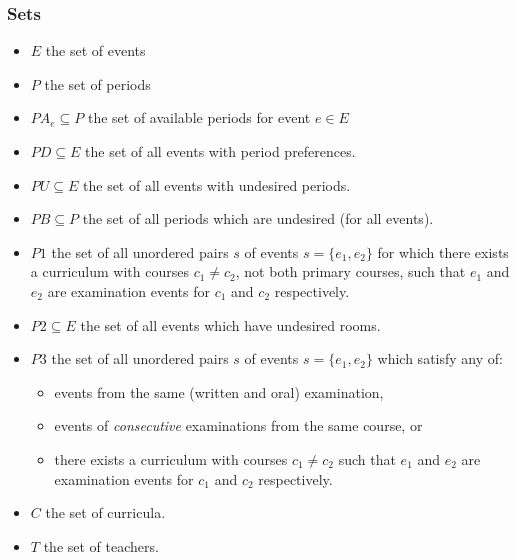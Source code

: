 \documentclass{article}
\theoremstyle{plain}
\numberwithin{theorem}{section}
\numberwithin{example}{section}
\theoremstyle{definition}
\begin{document}
\subsubsection*{Sets}
\begin{itemize}
    \item $E$ the set of events
    \item $P$ the set of periods
    \item $PA_e \subseteq P$ the set of available periods for event $e \in E$
    \item $PD \subseteq E$ the set of all events with period preferences.
    \item $PU \subseteq E$ the set of all events with undesired periods.
    \item $PB \subseteq P$ the set of all periods which are undesired (for all
        events).
    \item $P1$ the set of all unordered pairs $s$ of events $s = \{e_1, e_2\}$
        for which there exists a curriculum with courses $c_1 \neq c_2$, not
        both primary courses, such that $e_1$ and $e_2$ are examination events
        for $c_1$ and $c_2$ respectively.
    \item $P2 \subseteq E$ the set of all events which have undesired rooms.
    \item $P3$ the set of all unordered pairs $s$ of events $s = \{e_1, e_2\}$
        which satisfy any of:
        \begin{itemize}
            \item events from the same (written and oral) examination,
            \item events of \emph{consecutive} examinations from the same
                course, or
            \item there exists a curriculum with courses $c_1 \neq c_2$ such
            that $e_1$ and $e_2$ are examination events for $c_1$ and $c_2$
            respectively.
        \end{itemize}
    \item $C$ the set of curricula.
    \item $T$ the set of teachers.
\end{itemize}
\end{document}
